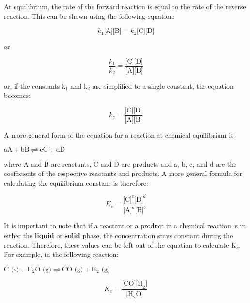 At equilibrium, the rate of the forward reaction is equal to the rate of the reverse reaction. This can be shown using the following equation:

\begin{equation*}
k_{1}\text{[A][B]} = k_{2}\text{[C][D]}
\end{equation*}

\begin{center}
or
\end{center}

\begin{equation*}
\frac{k_{1}}{k_{2}} = \frac{\text{[C][D]}}{\text{[A][B]}}
\end{equation*}

or, if the constants k$_{1}$ and k$_{2}$ are simplified to a single constant, the equation becomes:

\begin{equation*}
k_{c} = \frac{\text{[C][D]}}{\text{[A][B]}} 
\end{equation*}

A more general form of the equation for a reaction at chemical equilibrium is:
\begin{center}
${\text{aA} + \text{bB} \rightleftharpoons \text{cC} + \text{dD}}$
\end{center}

where A and B are reactants, C and D are products and a, b, c, and d are the coefficients of the respective reactants and products. A more general formula for calculating the equilibrium constant is therefore:

\begin{equation*}
K_{c} = \frac{\text{[C]}^{c}\text{[D]}^{d}}{\text{[A]}^{a}\text{[B]}^{b}} 
\end{equation*}

It is important to note that if a reactant or a product in a chemical reaction is in either the \textbf{liquid} or \textbf{solid} phase, the concentration stays constant during the reaction. Therefore, these values can be left out of the equation to calculate K$_{c}$. For example, in the following reaction:\\

\begin{center}
$\text{C (s)} + \text{H}_{2}\text{O (g)} \rightleftharpoons \text{CO (g)} + \text{H}_{2}\text{ (g)}$
\end{center}

\begin{equation*}
K_{c} = \frac{\text{[CO][H}_{2}\text{]}}{\text{[H}_{2}\text{O]}}
\end{equation*}

